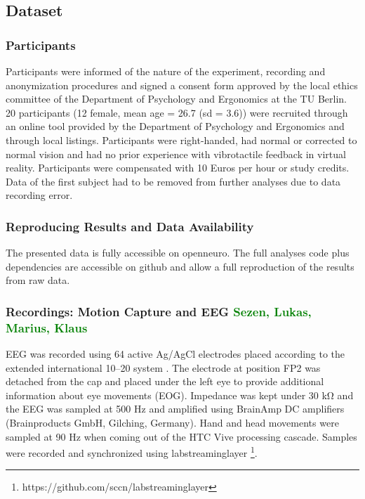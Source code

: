 \subsection{Dataset}
\subsubsection{Participants}
Participants were informed of the nature of the experiment, recording and anonymization procedures and signed a consent form approved by the local ethics committee of the Department of Psychology and Ergonomics at the TU Berlin. 20 participants (12 female, mean age = 26.7 (sd = 3.6)) were recruited through an online tool provided by the Department of Psychology and Ergonomics and through local listings. Participants were right-handed, had normal or corrected to normal vision and had no prior experience with vibrotactile feedback in virtual reality. Participants were compensated with 10 Euros per hour or study credits. Data of the first subject had to be removed from further analyses due to data recording error.

\subsubsection{Reproducing Results and Data Availability}
The presented data is fully accessible on openneuro. The full analyses code plus dependencies are accessible on github and allow a full reproduction of the results from raw data.

\subsubsection{Recordings: Motion Capture and EEG \textcolor{green}{Sezen, Lukas, Marius, Klaus}}
EEG was recorded using 64 active Ag/AgCl electrodes placed according to the extended international 10–20 system \cite{Chatrian1985a}. The electrode at position FP2 was detached from the cap and placed under the left eye to provide additional information about eye movements (EOG). Impedance was kept under 30 \si{\kohm} and the EEG was sampled at 500 Hz and amplified using BrainAmp DC amplifiers (Brainproducts GmbH, Gilching, Germany). Hand and head movements were sampled at 90 Hz when coming out of the HTC Vive processing cascade. Samples were recorded and synchronized using labstreaminglayer \footnote{https://github.com/sccn/labstreaminglayer}.